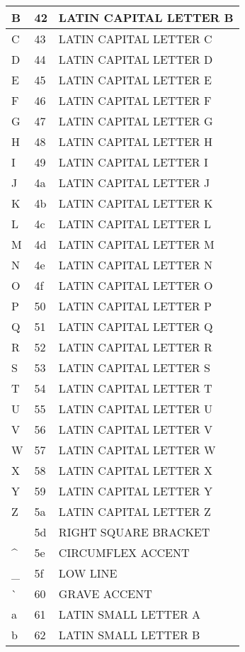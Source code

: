 \documentclass[12pt,letterpaper,openany]{book}
\begin{document}
\begin{center}
\begin{supertabular}{|m{0.25in}|m{0.5in}|m{4in}|}
B & 42 & LATIN CAPITAL LETTER B\\\hline
C & 43 & LATIN CAPITAL LETTER C\\\hline
D & 44 & LATIN CAPITAL LETTER D\\\hline
E & 45 & LATIN CAPITAL LETTER E\\\hline
F & 46 & LATIN CAPITAL LETTER F\\\hline
G & 47 & LATIN CAPITAL LETTER G\\\hline
H & 48 & LATIN CAPITAL LETTER H\\\hline
I & 49 & LATIN CAPITAL LETTER I\\\hline
J & 4a & LATIN CAPITAL LETTER J\\\hline
K & 4b & LATIN CAPITAL LETTER K\\\hline
L & 4c & LATIN CAPITAL LETTER L\\\hline
M & 4d & LATIN CAPITAL LETTER M\\\hline
N & 4e & LATIN CAPITAL LETTER N\\\hline
O & 4f & LATIN CAPITAL LETTER O\\\hline
P & 50 & LATIN CAPITAL LETTER P\\\hline
Q & 51 & LATIN CAPITAL LETTER Q\\\hline
R & 52 & LATIN CAPITAL LETTER R\\\hline
S & 53 & LATIN CAPITAL LETTER S\\\hline
T & 54 & LATIN CAPITAL LETTER T\\\hline
U & 55 & LATIN CAPITAL LETTER U\\\hline
V & 56 & LATIN CAPITAL LETTER V\\\hline
W & 57 & LATIN CAPITAL LETTER W\\\hline
X & 58 & LATIN CAPITAL LETTER X\\\hline
Y & 59 & LATIN CAPITAL LETTER Y\\\hline
Z & 5a & LATIN CAPITAL LETTER Z\\ & 5d & RIGHT SQUARE BRACKET\\\hline
\^{} & 5e & CIRCUMFLEX ACCENT\\\hline
\_ & 5f & LOW LINE\\\hline
\`{} & 60 & GRAVE ACCENT\\\hline
a & 61 & LATIN SMALL LETTER A\\\hline
b & 62 & LATIN SMALL LETTER B\\\hline

\end{supertabular}
\end{center}
\end{document}
